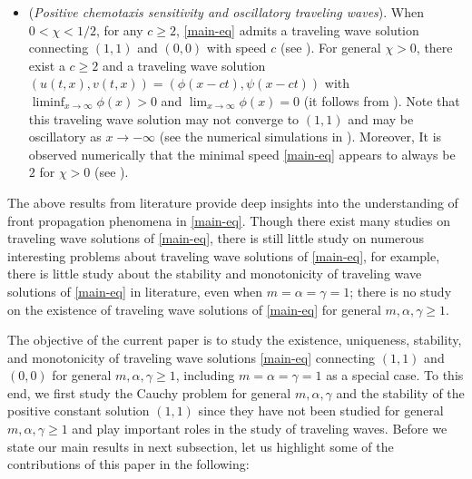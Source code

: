 \documentclass[11pt]{article} %
\theoremstyle{remark}
\theoremstyle{remark}
\numberwithin{equation}{section}
\numberwithin{figure}{section}
\numberwithin{table}{section}
\begin{document}
\begin{itemize}
\item ({\it Positive chemotaxis sensitivity and oscillatory  traveling waves}).
When $0<\chi<1/2$, for any $c\ge 2$, \eqref{main-eq} admits a traveling wave solution connecting
$(1,1)$ and $(0,0)$ with speed $c$ (see \cite[Theorem 1.4]{SaShXu2019}). 
 For general $\chi>0$, there  exist a $c\ge 2$ and  a traveling wave solution $(u(t,x),v(t,x))=(\phi(x-ct),\psi(x-ct))$ with
$\liminf_{x\to \infty}\phi(x)>0$ and $\lim_{x\to\infty}\phi(x)=0$ (it follows from \cite[Theorem 1.2]{HeRe2024}). Note that this traveling wave solution may not converge to $(1,1)$ and may be oscillatory as $x\to -\infty$ (see the numerical simulations in \cite{HeRe2024}). Moreover,
It is observed numerically that 
 the minimal speed \eqref{main-eq} appears to always be $2$  for $\chi >0$ (see \cite{HeRe2024}).

\end{itemize}


The above results from literature provide deep  insights into  the understanding of front propagation phenomena in \eqref{main-eq}. 
Though there exist many studies on traveling wave solutions of \eqref{main-eq}, there  is still  little study on  numerous interesting problems about traveling wave solutions of \eqref{main-eq}, for example,  there is little study about the stability and monotonicity of traveling wave solutions of \eqref{main-eq} in literature, even when $m=\alpha=\gamma=1$; there is no study on the existence of traveling wave solutions of \eqref{main-eq} for general $m,\alpha,\gamma\ge 1$.  


The objective of the current paper is to study the existence,  uniqueness, stability, and monotonicity of traveling wave solutions \eqref{main-eq} connecting
$(1,1)$ and $(0,0)$ for general $m,\alpha,\gamma\ge 1$, including $m=\alpha=\gamma=1$ as a special case.  To this end, we first  study the Cauchy problem for general $m,\alpha,\gamma$  and the stability of
the positive constant solution $(1,1)$ since they have not been studied for general $m,\alpha,\gamma\ge 1$ and play  important roles in the  study of traveling waves.  Before we state our main results in next subsection,  let us  highlight some of the contributions of this paper in the following:
\end{document}

